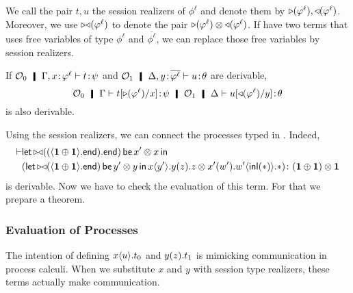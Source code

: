       We call the pair $t,u$ the session realizers of $\phi^\ell$ and
      denote them by $\mathop\triangleright(\varphi^\ell), \mathop\triangleleft(\varphi^\ell)$.
      Moreover, we use $\mathop{\triangleright\triangleleft}(\varphi^\ell)$ to denote the pair
      $\mathop\triangleright(\varphi^\ell)\otimes\mathop\triangleleft(\varphi^\ell)$.
      If have two terms that uses free variables of type $\phi^\ell$ and
      $\overline{\phi^\ell}$,
      we can replace those free variables by session realizers.
       \begin{corollary}
	If
	$\hypert_0\hmid \G,\tj{x}{\phi^\ell}\tr\tj{t}{\psi}$ and
	$\hypert_1\hmid \D,\tj{y}{\overline{\phi^\ell}}\tr\tj{u}{\theta}$
	are derivable,
	\[
	\hypert_0\hmid \G\tr\tj{t[\leftside{\phi^\ell}/ x]}{\psi}
	\hmid \hypert_1\hmid \D\tr\tj{u[\rightside{\phi^\ell}/ y]}{\theta}
	\]
	is also derivable.
       \end{corollary}
	\begin{example}
	 Using the session realizers, we can connect the processes typed
	 in .  Indeed,
	 \begin{align*}
	  \vdash &
	  \mathsf{let}\,{\mathop{\triangleright\triangleleft}((\langle{\mathbf{1}\oplus\mathbf{1}}\rangle.{\mathsf{end}}).{\mathsf{end}})}\,\mathsf
	  { be }\,{x'\otimes
	 x}\,\mathsf{ in }\,\\ &{
	 \left(\mathsf{let }\,{\mathop{\triangleright\triangleleft}(\langle{\mathbf{1}\oplus\mathbf{1}}\rangle.{\mathsf{end}})}\,\mathsf{ be }\,{y'\otimes y}\,\mathsf{ in }\,{
	 {x}\langle{y'}\rangle.{{{y}({z}).{z}}}
	 }
	 \otimes
	 {{x'}({w'}).{{w'}\langle{\mathsf{inl}({\ast})}\rangle.{\ast}}}\right)
	 }
	 \colon{(\mathbf{1}\oplus\mathbf{1})\otimes\mathbf{1}}
	 \end{align*}
	 is derivable.
	 Now we have to check the evaluation of this term.
	 For that we prepare a theorem.
	\end{example}


      \subsubsection{Evaluation of Processes}

      The intention of defining ${x}\langle{u}\rangle.{t_0}$ and ${{y}({z}).{t_1}}$
      is mimicking communication in process calculi.
      When we substitute $x$ and $y$ with session type realizers,
      these terms actually make communication.

